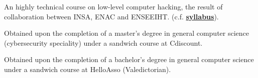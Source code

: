 \documentclass[10pt,a4paper,ragged2e,withhyper]{altacv}
\begin{document}
\begin{paracol}{2}
\medskip

\switchcolumn



  \smallskip


  \smallskip



  \divider

  \divider

  \divider


  An highly technical course on low-level computer hacking, the result of collaboration between INSA, ENAC and ENSEEIHT. (c.f. \href{https://tls-sec.github.io/documents/Syllabus_Ms_securite_Informatique_V1.pdf}{\bf{syllabus}}).

  \divider

  Obtained upon the completion of a master's degree in general computer science (cybersecurity speciality) under a sandwich course at Cdiscount.

  \divider

  Obtained upon the completion of a bachelor's degree in general computer science under a sandwich course at HelloAsso (Valedictorian).

  \divider



\end{paracol}
\end{document}
